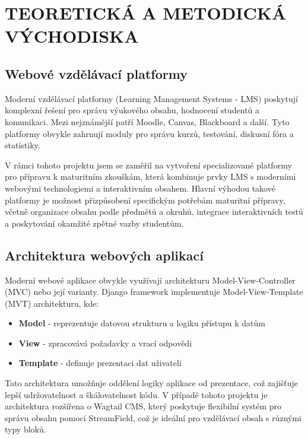 \documentclass[a4paper,12pt]{article}
\begin{document}
\newpage

\section{TEORETICKÁ A METODICKÁ VÝCHODISKA}

\subsection{Webové vzdělávací platformy}

Moderní vzdělávací platformy (Learning Management Systems - LMS) poskytují komplexní řešení pro správu výukového obsahu, hodnocení studentů a komunikaci. Mezi nejznámější patří Moodle, Canvas, Blackboard a další. Tyto platformy obvykle zahrnují moduly pro správu kurzů, testování, diskusní fóra a statistiky.

V rámci tohoto projektu jsem se zaměřil na vytvoření specializované platformy pro přípravu k maturitním zkouškám, která kombinuje prvky LMS s moderními webovými technologiemi a interaktivním obsahem. Hlavní výhodou takové platformy je možnost přizpůsobení specifickým potřebám maturitní přípravy, včetně organizace obsahu podle předmětů a okruhů, integrace interaktivních testů a poskytování okamžité zpětné vazby studentům.

\subsection{Architektura webových aplikací}

Moderní webové aplikace obvykle využívají architekturu Model-View-Controller (MVC) nebo její varianty. Django framework implementuje Model-View-Template (MVT) architekturu, kde:

\begin{itemize}
    \item \textbf{Model} - reprezentuje datovou strukturu a logiku přístupu k datům
    \item \textbf{View} - zpracovává požadavky a vrací odpovědi
    \item \textbf{Template} - definuje prezentaci dat uživateli
\end{itemize}

Tato architektura umožňuje oddělení logiky aplikace od prezentace, což zajišťuje lepší udržovatelnost a škálovatelnost kódu. V případě tohoto projektu je architektura rozšířena o Wagtail CMS, který poskytuje flexibilní systém pro správu obsahu pomocí StreamField, což je ideální pro vzdělávací obsah s různými typy bloků.
\end{document}
